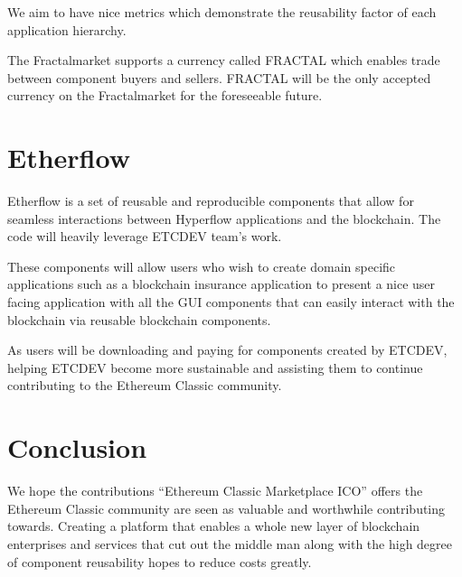 \documentclass[%
 aip,
 jmp,%
 amsmath,amssymb,
 reprint,%
]{revtex4-1}
\begin{document}
We aim to have nice metrics which demonstrate the reusability factor of each application hierarchy.

The Fractalmarket supports a currency called FRACTAL which enables trade between component buyers and sellers. FRACTAL will be the only accepted currency on the Fractalmarket for the foreseeable future.

\section{\label{sec:level1}Etherflow}

Etherflow is a set of reusable and reproducible components that allow for seamless interactions between Hyperflow applications and the blockchain. The code will heavily leverage ETCDEV team's work.

These components will allow users who wish to create domain specific applications such as a blockchain insurance application to present a nice user facing application with all the GUI components that can easily interact with the blockchain via reusable blockchain components.

As users will be downloading and paying for components created by ETCDEV, helping ETCDEV become more sustainable and assisting them to continue contributing to the Ethereum Classic community.


\section{\label{sec:level1}Conclusion}

We hope the contributions ``Ethereum Classic Marketplace ICO'' offers the Ethereum Classic community are seen as valuable and worthwhile contributing towards.
Creating a platform that enables a whole new layer of blockchain enterprises and services that cut out the middle man along with the high degree of component reusability hopes to reduce costs greatly.
\end{document}
